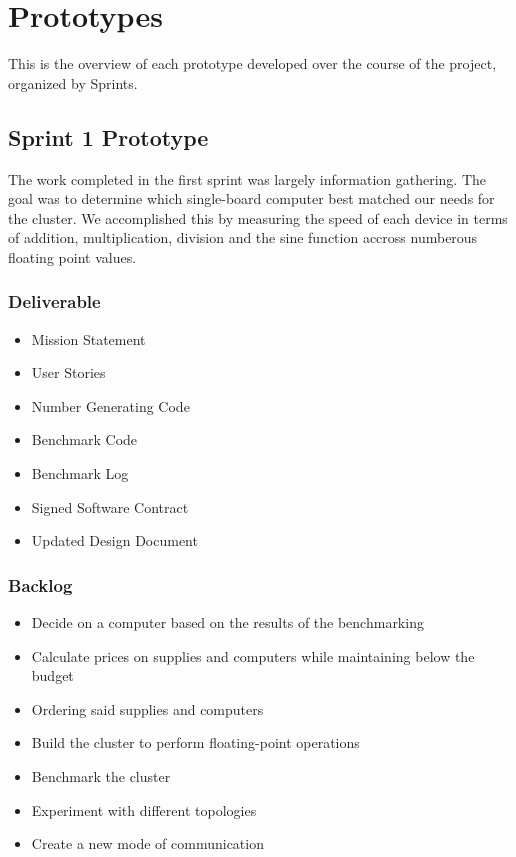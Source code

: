 

\chapter{Prototypes}


This is the overview of each prototype developed over the course of the project, organized by Sprints.

\section{Sprint 1 Prototype}

The work completed in the first sprint was largely information gathering. The goal was to determine which single-board computer best matched our needs for the cluster. We accomplished this by measuring the speed of each device in terms of addition, multiplication, division and the sine function accross numberous floating point values. 

\subsection{Deliverable}

\begin{itemize}
\item Mission Statement
\item User Stories
\item Number Generating Code
\item Benchmark Code
\item Benchmark Log
\item Signed Software Contract
\item Updated Design Document
\end{itemize}

\subsection{Backlog}

\begin{itemize}
\item Decide on a computer based on the results of the benchmarking
\item Calculate prices on supplies and computers while maintaining below the budget
\item Ordering said supplies and computers
\item Build the cluster to perform floating-point operations
\item Benchmark the cluster
\item Experiment with different topologies
\item Create a new mode of communication
\end{itemize}

